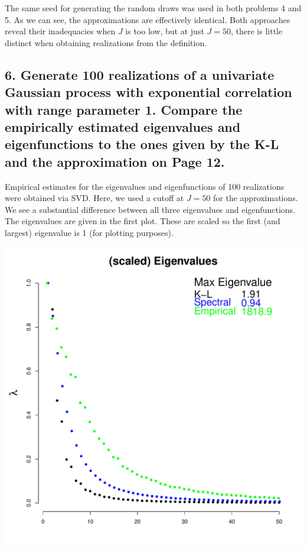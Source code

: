 \documentclass[12pt]{article}
\begin{document}
The same seed for generating the random draws was used in both problems 4 and 5. As we can see, the approximations are effectively identical. Both approaches reveal their inadequacies when $J$ is too low, but at just $J=50$, there is little distinct when obtaining realizations from the definition.

\subsection*{6. Generate 100 realizations of a univariate Gaussian process with exponential correlation with range parameter 1. Compare the empirically estimated eigenvalues and eigenfunctions to the ones given by the K-L and the approximation on Page 12.}

Empirical estimates for the eigenvalues and eigenfunctions of 100 realizations were obtained via SVD. Here, we used a cutoff at $J=50$ for the approximations. We see a substantial difference between all three eigenvalues and eigenfunctions. The eigenvalues are given in the first plot. These are scaled so the first (and largest) eigenvalue is 1 (for plotting purposes).

\begin{center}
\includegraphics[scale=0.4]{figs/eval.pdf}
\end{center}
\end{document}
